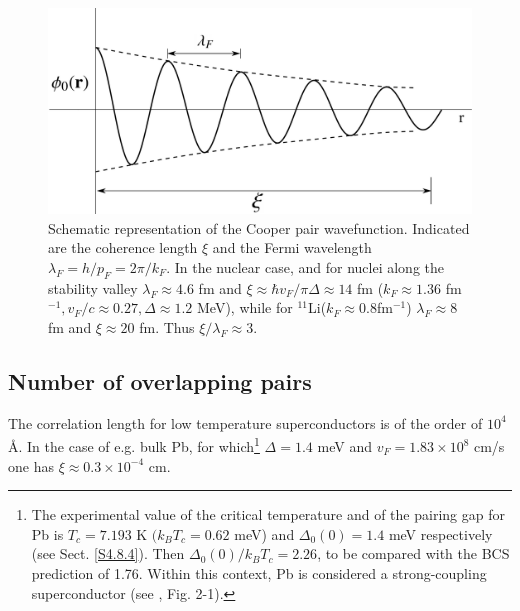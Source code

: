      
        

 \begin{figure}[h]
 	\centerline{\includegraphics*[width=12cm,angle=0	]{nutshell/figs/fig3B2}}
 	\caption{Schematic representation of the Cooper pair wavefunction. Indicated are the coherence length $\xi$ and the Fermi wavelength $\lambda_F=h/p_F=2\pi/k_F$. In the nuclear case, and for nuclei along the stability valley $\lambda_F\approx4.6$ fm and $\xi\approx \hbar v_F/\pi\Delta\approx14$ fm ($k_F\approx 1.36$ fm $^{-1}, v_F/c\approx0.27, \Delta\approx 1.2$ MeV), while for $^{11}$Li($k_F\approx0.8$fm$^{-1}$) $\lambda_F\approx 8$ fm and $\xi\approx 20$ fm. Thus $\xi/\lambda_F\approx 3$. }\label{fig3B2}
 \end{figure}
 





\subsection{Number of overlapping pairs}
 

The correlation length for low temperature superconductors is of the order of $10^4$\AA. In the case of e.g. bulk Pb, for which\footnote{\label{foot75}  The experimental value of the critical temperature and of the pairing gap for Pb is $T_c=7.193$ K $(k_BT_c=0.62$ meV) and $\Delta_0(0)=1.4$ meV respectively (see Sect. \ref{S4.8.4}).  Then  $\Delta_0(0)/k_BT_c=2.26$, to be compared with the BCS prediction of 1.76. Within this context, Pb is considered a strong-coupling superconductor (see \cite{Tinkham:96}, Fig. 2-1).} $\Delta=1.4$ meV and $v_F=1.83\times10^8$ cm/s one has $\xi\approx0.3\times10^{-4}$ cm. 

